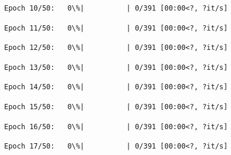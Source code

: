 \documentclass[11pt]{article}
\begin{document}
    
    
    \begin{Verbatim}[commandchars=\\\{\}]
Epoch 10/50:   0\%|          | 0/391 [00:00<?, ?it/s]
    \end{Verbatim}

    
    
    \begin{Verbatim}[commandchars=\\\{\}]
Epoch 11/50:   0\%|          | 0/391 [00:00<?, ?it/s]
    \end{Verbatim}

    
    
    \begin{Verbatim}[commandchars=\\\{\}]
Epoch 12/50:   0\%|          | 0/391 [00:00<?, ?it/s]
    \end{Verbatim}

    
    
    \begin{Verbatim}[commandchars=\\\{\}]
Epoch 13/50:   0\%|          | 0/391 [00:00<?, ?it/s]
    \end{Verbatim}

    
    
    \begin{Verbatim}[commandchars=\\\{\}]
Epoch 14/50:   0\%|          | 0/391 [00:00<?, ?it/s]
    \end{Verbatim}

    
    
    \begin{Verbatim}[commandchars=\\\{\}]
Epoch 15/50:   0\%|          | 0/391 [00:00<?, ?it/s]
    \end{Verbatim}

    
    
    \begin{Verbatim}[commandchars=\\\{\}]
Epoch 16/50:   0\%|          | 0/391 [00:00<?, ?it/s]
    \end{Verbatim}

    
    
    \begin{Verbatim}[commandchars=\\\{\}]
Epoch 17/50:   0\%|          | 0/391 [00:00<?, ?it/s]
    \end{Verbatim}
\end{document}
